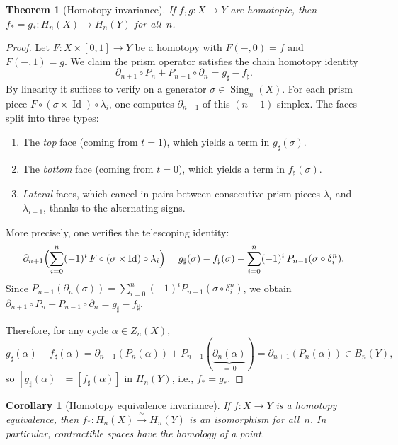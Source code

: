 \documentclass[12pt,a4paper,openany]{book}
\theoremstyle{definition}
\theoremstyle{plain}
\newtheorem{theorem}[definition]{Theorem}
\newtheorem{corollary}[definition]{Corollary}
\theoremstyle{remark}
\DeclareMathOperator{\Id}{Id}
\begin{document}
\begin{theorem}[Homotopy invariance]\label{thm:homotopy-invariance}
If $f,g\colon X\to Y$ are homotopic, then $f_*=g_*\colon H_n(X)\to H_n(Y)$
for all~$n$.
\end{theorem}

\begin{proof}
Let $F\colon X\times[0,1]\to Y$ be a homotopy with $F(-,0)=f$ and $F(-,1)=g$.
We claim the prism operator satisfies the chain homotopy identity
\[
  \partial_{n+1}\circ P_n + P_{n-1}\circ\partial_n = g_\sharp - f_\sharp.
\]
By linearity it suffices to verify on a generator $\sigma\in\operatorname{Sing}_n(X)$.
For each prism piece $F\circ(\sigma\times\Id)\circ\lambda_i$, one computes
$\partial_{n+1}$ of this $(n{+}1)$-simplex.  The faces split into three types:
\begin{enumerate}[label=(\alph*),leftmargin=2.5em]
  \item The \emph{top} face (coming from $t=1$), which yields a term in $g_\sharp(\sigma)$.
  \item The \emph{bottom} face (coming from $t=0$), which yields a term in $f_\sharp(\sigma)$.
  \item \emph{Lateral} faces, which cancel in pairs between consecutive prism
    pieces $\lambda_i$ and $\lambda_{i+1}$, thanks to the alternating signs.
\end{enumerate}
More precisely, one verifies the telescoping identity:
\[
  \partial_{n+1}\Bigl(\sum_{i=0}^n (-1)^i\,F\circ(\sigma\times\Id)\circ\lambda_i\Bigr)
  = g_\sharp(\sigma)-f_\sharp(\sigma)
    -\sum_{i=0}^n(-1)^i\,P_{n-1}(\sigma\circ\delta_i^n).
\]
Since $P_{n-1}(\partial_n(\sigma))=\sum_{i=0}^n(-1)^i P_{n-1}(\sigma\circ\delta_i^n)$,
we obtain $\partial_{n+1}\circ P_n + P_{n-1}\circ\partial_n = g_\sharp-f_\sharp$.

Therefore, for any cycle $\alpha\in Z_n(X)$,
\[
  g_\sharp(\alpha)-f_\sharp(\alpha)
  = \partial_{n+1}(P_n(\alpha))+P_{n-1}(\underbrace{\partial_n(\alpha)}_{=\,0})
  = \partial_{n+1}(P_n(\alpha))
  \in B_n(Y),
\]
so $[g_\sharp(\alpha)]=[f_\sharp(\alpha)]$ in $H_n(Y)$, i.e., $f_*=g_*$.
\end{proof}

\begin{corollary}[Homotopy equivalence invariance]\label{cor:htpy-equiv-invariance}
If $f\colon X\to Y$ is a homotopy equivalence, then
$f_*\colon H_n(X)\xrightarrow{\;\sim\;} H_n(Y)$ is an isomorphism for all~$n$.
In particular, contractible spaces have the homology of a point.
\end{corollary}
\end{document}
